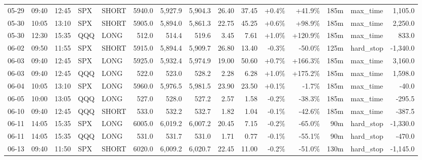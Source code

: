 \documentclass[11pt,a4paper,twoside]{article}
\begin{document}
\begin{landscape}
\begin{center}
\begin{longtable}{>{\color{txtmain}}l l l l l r r r r r r r r >{\color{txtmain}}l r}
05-29 & 09:40 & 12:45 & SPX & SHORT & 5940.0 & 5,927.9 & 5,904.3 & 26.40 & 37.45 & \textcolor{wingreen}{+0.4\%} & \textcolor{wingreen}{+41.9\%} & 185m & max\_time & \textcolor{wingreen}{1,105.0} \\
05-30 & 10:05 & 13:10 & SPX & SHORT & 5905.0 & 5,894.0 & 5,861.3 & 22.75 & 45.25 & \textcolor{wingreen}{+0.6\%} & \textcolor{wingreen}{+98.9\%} & 185m & max\_time & \textcolor{wingreen}{2,250.0} \\
05-30 & 12:30 & 15:35 & QQQ & LONG & 512.0 & 514.4 & 519.6 & 3.45 & 7.61 & \textcolor{wingreen}{+1.0\%} & \textcolor{wingreen}{+120.9\%} & 185m & max\_time & \textcolor{wingreen}{833.0} \\
06-02 & 09:50 & 11:55 & SPX & SHORT & 5915.0 & 5,894.4 & 5,909.7 & 26.80 & 13.40 & \textcolor{lossred}{-0.3\%} & \textcolor{lossred}{-50.0\%} & 125m & hard\_stop & \textcolor{lossred}{-1,340.0} \\
06-03 & 09:40 & 12:45 & SPX & LONG & 5925.0 & 5,932.4 & 5,974.9 & 19.00 & 50.60 & \textcolor{wingreen}{+0.7\%} & \textcolor{wingreen}{+166.3\%} & 185m & max\_time & \textcolor{wingreen}{3,160.0} \\
06-03 & 09:40 & 12:45 & QQQ & LONG & 522.0 & 523.0 & 528.2 & 2.28 & 6.28 & \textcolor{wingreen}{+1.0\%} & \textcolor{wingreen}{+175.2\%} & 185m & max\_time & \textcolor{wingreen}{1,598.0} \\
06-04 & 10:05 & 13:10 & SPX & LONG & 5960.0 & 5,976.5 & 5,981.5 & 23.90 & 23.50 & \textcolor{wingreen}{+0.1\%} & \textcolor{lossred}{-1.7\%} & 185m & max\_time & \textcolor{lossred}{-40.0} \\
06-05 & 10:00 & 13:05 & QQQ & LONG & 527.0 & 528.0 & 527.2 & 2.57 & 1.58 & \textcolor{lossred}{-0.2\%} & \textcolor{lossred}{-38.3\%} & 185m & max\_time & \textcolor{lossred}{-295.5} \\
06-10 & 09:40 & 12:45 & QQQ & SHORT & 533.0 & 532.2 & 532.7 & 1.82 & 1.04 & \textcolor{lossred}{-0.1\%} & \textcolor{lossred}{-42.6\%} & 185m & max\_time & \textcolor{lossred}{-387.5} \\
06-11 & 14:05 & 15:35 & SPX & LONG & 6005.0 & 6,019.2 & 6,007.2 & 20.45 & 7.15 & \textcolor{lossred}{-0.2\%} & \textcolor{lossred}{-65.0\%} & 90m & hard\_stop & \textcolor{lossred}{-1,330.0} \\
06-11 & 14:05 & 15:35 & QQQ & LONG & 531.0 & 531.7 & 531.0 & 1.71 & 0.77 & \textcolor{lossred}{-0.1\%} & \textcolor{lossred}{-55.1\%} & 90m & hard\_stop & \textcolor{lossred}{-470.0} \\
06-13 & 09:40 & 11:50 & SPX & SHORT & 6020.0 & 6,009.2 & 6,020.7 & 22.45 & 11.00 & \textcolor{lossred}{-0.2\%} & \textcolor{lossred}{-51.0\%} & 130m & hard\_stop & \textcolor{lossred}{-1,145.0} \\

\end{longtable}
\end{center}
\end{landscape}
\end{document}
